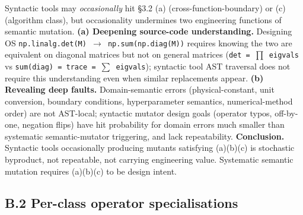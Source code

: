 \documentclass[manuscript,screen,review]{acmart}
\begin{document}
Syntactic tools may \emph{occasionally} hit §3.2 (a)
(cross-function-boundary) or (c) (algorithm class), but occasionality
undermines two engineering functions of semantic mutation. \textbf{(a)
Deepening source-code understanding.} Designing OS
\texttt{np.linalg.det(M)\ $\to$\ np.sum(np.diag(M))} requires knowing the
two are equivalent on diagonal matrices but not on general matrices
(\texttt{det\ =\ $\prod$\ eigvals} vs
\texttt{sum(diag)\ =\ trace\ =\ $\sum$\ eigvals}); syntactic tool AST
traversal does not require this understanding even when similar
replacements appear. \textbf{(b) Revealing deep faults.}
Domain-semantic errors (physical-constant, unit conversion, boundary
conditions, hyperparameter semantics, numerical-method order) are not
AST-local; syntactic mutator design goals (operator typos, off-by-one,
negation flips) have hit probability for domain errors much smaller than
systematic semantic-mutator triggering, and lack repeatability.
\textbf{Conclusion.} Syntactic tools occasionally producing mutants
satisfying (a)(b)(c) is stochastic byproduct, not repeatable, not
carrying engineering value. Systematic semantic mutation requires
(a)(b)(c) to be design intent.

\subsection{B.2 Per-class operator specialisations}\label{b.2-per-class-operator-specialisations}
\end{document}
